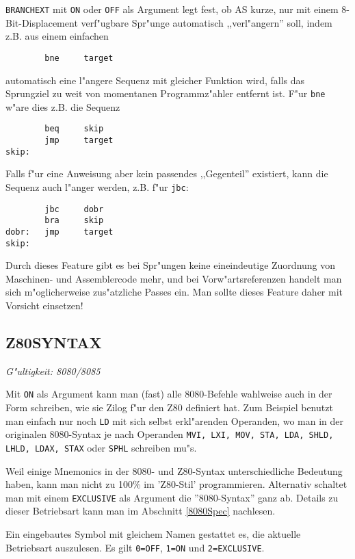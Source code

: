 \documentclass[12pt,a4paper,twoside]{report}
\makeatletter
\newcommand{\tty}[1]{{\tt #1}}
\newcommand{\ttindex}[1]{\index{#1@{\tt #1}}}
\makeatother
\begin{document}
{\tt BRANCHEXT} mit \tty{ON} oder \tty{OFF} als Argument legt fest, ob AS
kurze, nur mit einem 8-Bit-Displacement verf"ugbare Spr"unge automatisch
,,verl"angern'' soll, indem z.B. aus einem einfachen
\begin{verbatim}
        bne     target
\end{verbatim}
automatisch eine l"angere Sequenz mit gleicher Funktion wird, falls das
Sprungziel zu weit von momentanen Programmz"ahler entfernt ist.  F"ur
{\tt bne} w"are dies z.B. die Sequenz
\begin{verbatim}
        beq     skip
        jmp     target
skip:
\end{verbatim}
Falls f"ur eine Anweisung aber kein passendes ,,Gegenteil'' existiert,
kann die Sequenz auch l"anger werden, z.B. f"ur {\tt jbc}:
\begin{verbatim}
        jbc     dobr
        bra     skip
dobr:   jmp     target
skip:
\end{verbatim}
Durch dieses Feature gibt es bei Spr"ungen keine eineindeutige Zuordnung
von Maschinen- und Assemblercode mehr, und bei Vorw"artsreferenzen handelt
man sich m"oglicherweise zus"atzliche Passes ein.  Man sollte dieses
Feature daher mit Vorsicht einsetzen!


\subsection{Z80SYNTAX}
\ttindex{Z80SYNTAX}

{\em G"ultigkeit: 8080/8085}

Mit \tty{ON} als Argument kann man (fast) alle 8080-Befehle wahlweise
auch in der Form schreiben, wie sie Zilog f"ur den Z80 definiert hat.
Zum Beispiel benutzt man einfach nur noch \tty{LD} mit sich selbst
erkl"arenden Operanden, wo man in der originalen 8080-Syntax je nach
Operanden \tty{MVI, LXI, MOV, STA, LDA, SHLD, LHLD, LDAX, STAX} oder
\tty{SPHL} schreiben mu"s.

Weil einige Mnemonics in der 8080- und Z80-Syntax unterschiedliche
Bedeutung haben, kann man nicht zu 100\% im 'Z80-Stil' programmieren.
Alternativ schaltet man mit einem \tty{EXCLUSIVE} als Argument die
''8080-Syntax'' ganz ab.  Details zu dieser Betriebsart kann man 
im Abschnitt \ref{8080Spec} nachlesen.

Ein eingebautes Symbol mit gleichem Namen gestattet es, die aktuelle
Betriebsart auszulesen.  Es gilt \tty{0=OFF}, \tty{1=ON} und
\tty{2=EXCLUSIVE}.
\end{document}
